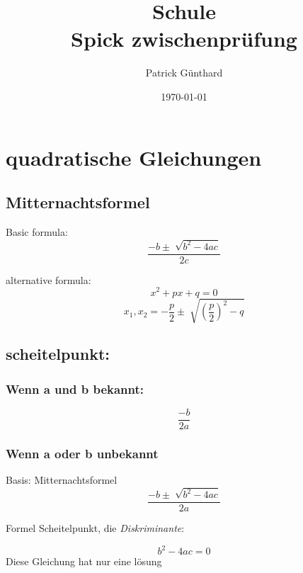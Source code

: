 \documentclass[a4]{article}
\title{Schule\\
	Spick zwischenprüfung
}
\author{Patrick Günthard}
\date{\today}
\begin{document}
	\maketitle

\section{quadratische Gleichungen}
\label{sec-1}

\subsection{Mitternachtsformel}
\label{sec-1-1}

Basic formula:
\begin{equation}
\frac{-b \pm \sqrt[]{b^2 - 4ac}}{2c}
\end{equation}

alternative formula:
\begin{equation}
x^2 + px + q = 0
\end{equation}
\begin{equation}
x_1, x_2 = - \frac{p}{2} \pm \sqrt[]{ (\frac{p}{2})^2 - q }
\end{equation}

\subsection{scheitelpunkt:}
\label{sec-1-2}

\subsubsection{Wenn a und b bekannt:}
\label{sec-1-2-1}

\begin{equation}
\frac{-b}{2a}
\end{equation}

\subsubsection{Wenn a oder b unbekannt}
\label{sec-1-2-2}
Basis: Mitternachtsformel
\begin{equation}
\frac{-b \pm \sqrt[]{b^2 - 4ac}}{2a}
\end{equation}

Formel Scheitelpunkt, die \emph{Diskriminante}:

\begin{equation}
b^2 - 4ac = 0
\end{equation}
Diese Gleichung hat nur eine lösung
\end{document}
